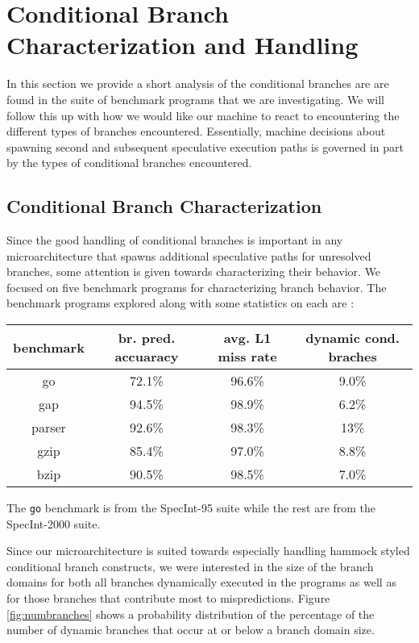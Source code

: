 \documentclass[10pt,dvips]{article}
\begin{document}
\section{Conditional Branch Characterization and Handling}
%
In this section we provide a short analysis of the conditional
branches are are found in the suite of benchmark programs that
we are investigating.  We will follow this up with how we would
like our machine to react to encountering the different types of
branches encountered.  Essentially, machine decisions about
spawning second and subsequent speculative execution paths is governed
in part by the types of conditional branches encountered.
%
\subsection{Conditional Branch Characterization}
%
Since the good handling of conditional branches is important
in any microarchitecture that spawns additional speculative
paths for unresolved branches, some attention is given
towards characterizing their behavior.  We focused
on five benchmark programs for characterizing branch behavior.
The benchmark programs explored along with some statistics on each
are :

\begin{tabular}{|c|c|c|c|}
\hline 
benchmark&
br. pred. accuaracy&
avg. L1 miss rate&
dynamic cond. braches\\
\hline
\hline 
go&
72.1\%&
96.6\%&
9.0\%\\
\hline 
gap&
94.5\%&
98.9\%&
6.2\%\\
\hline 
parser&
92.6\%&
98.3\%&
13\%\\
\hline 
gzip&
85.4\%&
97.0\%&
8.8\%\\
\hline 
bzip&
90.5\%&
98.5\%&
7.0\%\\
\hline
\end{tabular}

The 
{\tt go} benchmark is from the SpecInt-95 suite while the rest
are from the SpecInt-2000 suite.

Since our microarchitecture is suited towards especially handling
hammock styled conditional branch constructs, we were interested
in the size of the branch domains for both all branches
dynamically executed in the programs as well as for those branches 
that contribute most to mispredictions.
Figure \ref{fig:numbranches} shows a probability distribution of
the percentage of the number of dynamic branches that occur at
or below a branch domain size.  
\end{document}
